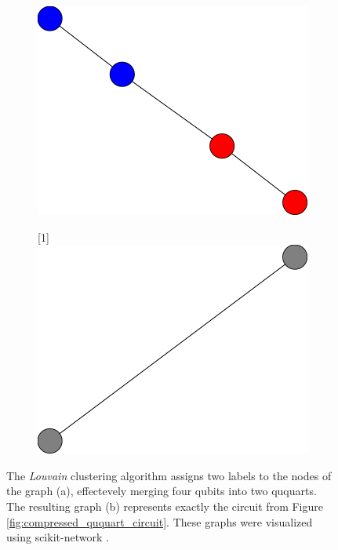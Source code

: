   \begin{figure}[H]
    \centering
    \begin{subfigure}{.25\textwidth}
      \centering
      \includegraphics[width=\linewidth]{figures/graphs/evolution-1/graph_wl.pdf}
      \caption{}
    \end{subfigure}%
    \begin{subfigure}{.25\textwidth}
      \centering
      \scalebox{-1}[1]{\includegraphics[width=\linewidth]{figures/graphs/evolution-2/graph_w.pdf}}
      \caption{}
    \end{subfigure}
    \caption{The \textit{Louvain} clustering algorithm assigns two labels to the nodes of the graph (a), effectevely merging four qubits into two ququarts. The resulting graph (b) represents exactly the circuit from Figure \ref{fig:compressed_ququart_circuit}. These graphs were visualized using scikit-network \cite{JMLR:v21:20-412}.}
    \label{fig:ququart_graph}
  \end{figure}

